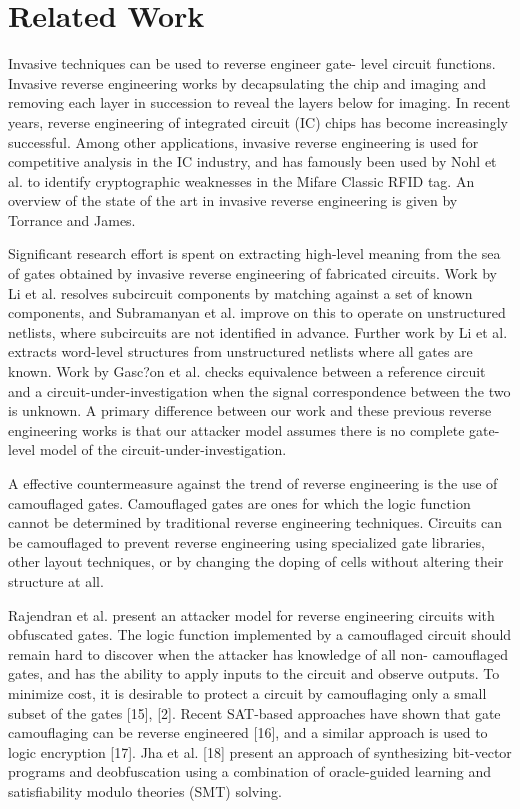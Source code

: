 \documentclass[proposal]{umassthesis}  %
\begin{document}
\section{Related Work}
Invasive techniques can be used to reverse engineer gate- level circuit functions. Invasive reverse engineering works by decapsulating the chip and imaging and removing each layer in succession to reveal the layers below for imaging. In recent years, reverse engineering of integrated circuit (IC) chips has become increasingly successful. Among other applications, invasive reverse engineering is used for competitive analysis in the IC industry, and has famously been used by Nohl et al. to identify cryptographic weaknesses in the Mifare Classic RFID tag. An overview of the state of the art in invasive reverse engineering is given by Torrance and James.

Significant research effort is spent on extracting high-level meaning from the sea of gates obtained by invasive reverse engineering of fabricated circuits. Work by Li et al. resolves subcircuit components by matching against a set of known components, and Subramanyan et al. improve on this to operate on unstructured netlists, where subcircuits are not identified in advance. Further work by Li et al. extracts word-level structures from unstructured netlists where all gates are known. Work by Gasc?on et al. checks equivalence between a reference circuit and a circuit-under-investigation when the signal correspondence between the two is unknown. A primary difference between our work and these previous reverse engineering works is that our attacker model assumes there is no complete gate-level model of the circuit-under-investigation.

A effective countermeasure against the trend of reverse engineering is the use of camouflaged gates. Camouflaged gates are ones for which the logic function cannot be determined by traditional reverse engineering techniques. Circuits can be camouflaged to prevent reverse engineering using specialized gate libraries, other layout techniques, or by changing the doping of cells without altering their structure at all.

Rajendran et al. present an attacker model for reverse engineering circuits with obfuscated gates. The logic function implemented by a camouflaged circuit should remain hard to discover when the attacker has knowledge of all non- camouflaged gates, and has the ability to apply inputs to the circuit and observe outputs. To minimize cost, it is desirable to protect a circuit by camouflaging only a small subset of the gates [15], [2]. Recent SAT-based approaches have shown that gate camouflaging can be reverse engineered [16], and a similar approach is used to logic encryption [17]. Jha et al. [18] present an approach of synthesizing bit-vector programs and deobfuscation using a combination of oracle-guided learning and satisfiability modulo theories (SMT) solving.
\end{document}
